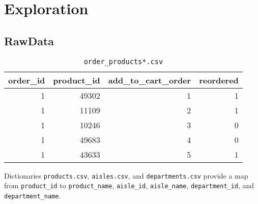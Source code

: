 \documentclass[handout]{beamer}
\begin{document}
\section%
{Exploration}\label{exploration}

\subsection{RawData}

\begin{frame}%


\begin{table}[h]
  \centering
  \caption{\texttt{order\_products*.csv}}
  \label{tab:order-products}
  {\ttfamily
  \begin{tabular}{rrrr}
    \toprule
    order\_id & product\_id & add\_to\_cart\_order & reordered \\
    \midrule
    1         & 49302       & 1                    & 1         \\
    1         & 11109       & 2                    & 1         \\
    1         & 10246       & 3                    & 0         \\
    1         & 49683       & 4                    & 0         \\
    1         & 43633       & 5                    & 1         \\
    \bottomrule
  \end{tabular}
  }
\end{table}

Dictionaries \texttt{products.csv}, \texttt{aisles.csv}, and \texttt{departments.csv} provide a map from
\texttt{product\_id} to \texttt{product\_name}, \texttt{aisle\_id}, \texttt{aisle\_name}, \texttt{department\_id}, and \texttt{department\_name}.

\end{frame}
\end{document}
